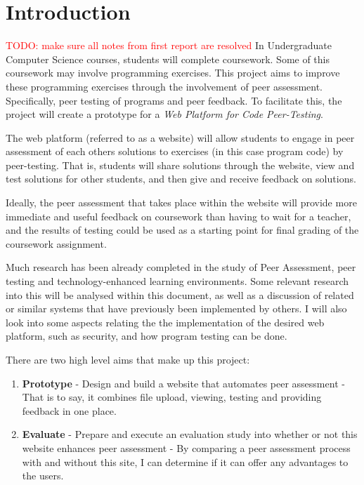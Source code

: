 \documentclass[a4paper,11pt]{report}
\newcommand{\todo}[1]{\textcolor{red}{TODO: #1}}
\begin{document}
\chapter{Introduction}
\todo{make sure all notes from first report are resolved}
In Undergraduate Computer Science courses, students will complete coursework. Some of this coursework may involve programming exercises. This project aims to improve these programming exercises through the involvement of peer assessment. Specifically, peer testing of programs and peer feedback. To facilitate this, the project will create a prototype for a \textit{Web Platform for Code Peer-Testing}.\par
The web platform (referred to as a website) will allow students to engage in peer assessment of each others solutions to exercises (in this case program code) by peer-testing. That is, students will share solutions through the website, view and test solutions for other students, and then give and receive feedback on solutions.\par
Ideally, the peer assessment that takes place within the website will provide more immediate and useful feedback on coursework than having to wait for a teacher, and the results of testing could be used as a starting point for final grading of the coursework assignment.\par

Much research has been already completed in the study of Peer Assessment, peer testing and technology-enhanced learning environments. Some relevant research into this will be analysed within this document, as well as a discussion of related or similar systems that have previously been implemented by others. I will also look into some aspects relating the the implementation of the desired web platform, such as security, and how program testing can be done.\par

There are two high level aims that make up this project:
\begin{enumerate}
\item \textbf{Prototype} - Design and build a website that automates peer assessment - That is to say, it combines file upload, viewing, testing and providing feedback in one place.
\item \textbf{Evaluate} - Prepare and execute an evaluation study into whether or not this website enhances peer assessment - By comparing a peer assessment process with and without this site, I can determine if it can offer any advantages to the users.
\end{enumerate}
\end{document}

